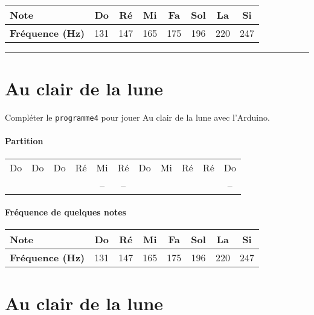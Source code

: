 \documentclass[12pt,a4paper]{article}
\begin{document}
\begin{center}
\begin{tabular}{l|c|c|c|c|c|c|c}
\textbf{Note}						& \textbf{Do} & \textbf{Ré} & \textbf{Mi} & \textbf{Fa} & \textbf{Sol} & \textbf{La} & \textbf{Si} \\
\hline
\textbf{Fréquence (Hz)} 	& 131 & 147 & 165 & 175 & 196 & 220 & 247 \\
\end{tabular}
\end{center}

\hrule{}

\section*{Au clair de la lune}

Compléter le \texttt{programme4} pour jouer \og Au clair de la lune \fg{} avec l'Arduino.

\paragraph{Partition}

\begin{center}
\begin{tabular}{|ccccccccccc|}
\hline
Do 		& Do 		& Do 		& Ré 		& Mi 		& Ré 		& Do 		& Mi 		& Ré 		& Ré 		& Do \\
\cdot	& \cdot	& \cdot	& \cdot	& --			& --			& \cdot	& \cdot	& \cdot	& \cdot	& -- \\
\hline
\end{tabular}
\end{center}

\paragraph{Fréquence de quelques notes}

\begin{center}
\begin{tabular}{l|c|c|c|c|c|c|c}
\textbf{Note}						& \textbf{Do} & \textbf{Ré} & \textbf{Mi} & \textbf{Fa} & \textbf{Sol} & \textbf{La} & \textbf{Si} \\
\hline
\textbf{Fréquence (Hz)} 	& 131 & 147 & 165 & 175 & 196 & 220 & 247 \\
\end{tabular}
\end{center}

\section*{Au clair de la lune}
\end{document}
